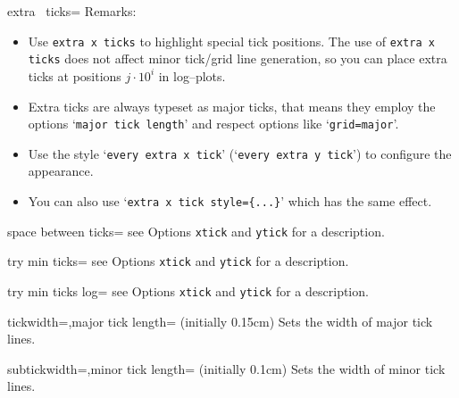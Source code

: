 \begin{pgfplotsxykey}{extra \x\ ticks=}
Remarks:
\begin{itemize} 
\item Use \texttt{extra x ticks} to highlight special tick positions. The use of \texttt{extra x ticks} does not affect minor tick/grid line generation, so you can place extra ticks at positions $j\cdot 10^i$ in log--plots. 
\item Extra ticks are always typeset as major ticks, that means they employ the options `\texttt{major tick length}' and respect options like `\texttt{grid=major}'.
\item Use the style `\texttt{every extra x tick}' (`\texttt{every extra y tick}') to configure the appearance.
\item You can also use `\texttt{extra x tick style=\{...\}}' which has the same effect.
\end{itemize}
\end{pgfplotsxykey}

\begin{pgfplotskey}{space between ticks=}
see Options \texttt{xtick} and \texttt{ytick} for a description.
\end{pgfplotskey}

\begin{pgfplotskey}{try min ticks=}
see Options \texttt{xtick} and \texttt{ytick} for a description.
\end{pgfplotskey}

\begin{pgfplotskey}{try min ticks log=}
see Options \texttt{xtick} and \texttt{ytick} for a description.
\end{pgfplotskey}

\begin{pgfplotskeylist}{tickwidth=,major tick length= (initially 0.15cm)}
	Sets the width of major tick lines.
\end{pgfplotskeylist}

\begin{pgfplotskeylist}{subtickwidth=,minor tick length= (initially 0.1cm)}
	Sets the width of minor tick lines.
\end{pgfplotskeylist}

